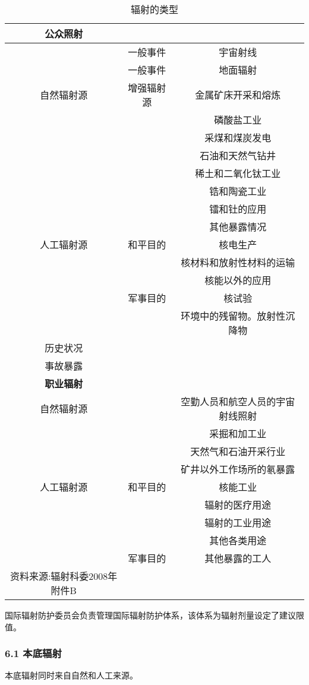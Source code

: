 \begin{table}[ht]
\centering
\caption{辐射的类型}\label{DLFS_1}
\begin{tabular}{|c|c|c}
\hline
\textbf{公众照射} &  &  \\
\hline
 & 	一般事件 & 宇宙射线\\
\hline
 &  一般事件 & 地面辐射\\
\hline
自然辐射源 & 增强辐射源 & 	金属矿床开采和熔炼\\
\hline
 &  & 磷酸盐工业\\
\hline
 &  & 采煤和煤炭发电\\
\hline
 &  & 石油和天然气钻井\\
\hline
 &  & 稀土和二氧化钛工业\\
\hline
 &  & 锆和陶瓷工业\\
\hline
 &  & 镭和钍的应用\\
\hline
 &  & 其他暴露情况\\
\hline
人工辐射源 & 和平目的 &	核电生产 \\
\hline
 &  & 核材料和放射性材料的运输\\
\hline
 &  & 核能以外的应用\\
\hline
 & 军事目的 & 核试验\\
\hline
 & & 环境中的残留物。放射性沉降物\\
\hline
历史状况 & & \\
\hline
事故暴露 & & \\
\hline
\textbf{职业辐射} & & \\
\hline
自然辐射源 &  & 空勤人员和航空人员的宇宙射线照射\\
\hline
 & & 采掘和加工业\\
\hline
 & & 天然气和石油开采行业\\
\hline
 & & 矿井以外工作场所的氡暴露\\
\hline
人工辐射源 & 和平目的 & 核能工业\\
\hline
 & & 辐射的医疗用途\\
\hline
 & & 辐射的工业用途\\
\hline
 & & 其他各类用途\\
\hline
 & 军事目的 & 其他暴露的工人\\
\hline
资料来源:辐射科委2008年附件B &  &  \\
\hline
\end{tabular}
\end{table}
国际辐射防护委员会负责管理国际辐射防护体系，该体系为辐射剂量设定了建议限值。

\subsubsection{6.1 本底辐射}
本底辐射同时来自自然和人工来源。

